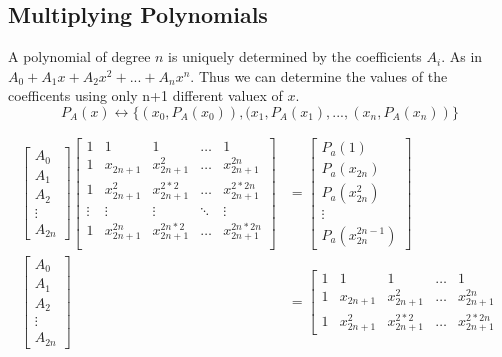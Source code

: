 \documentclass[a4paper]{article}
\begin{document}
\subsection{Multiplying Polynomials}
A polynomial of degree $n$ is uniquely determined by the coefficients $A_i$. As in $ A_0 + A_1 x + A_2 x^2 + ... + A_n x^n$. Thus we can determine the values of the coefficents using only n+1 different valuex of $x$.
$$P_A (x) \leftrightarrow \{(x_0, P_A (x_0)), (x_1, P_A (x_1), ..., (x_n, P_A (x_n))\}$$

 \begin{align*}
		 \left[ \begin{array}{c} A_0 \\ A_1 \\ A_2 \\ \vdots \\ A_{2n} \end{array} \right]
		\left[ \begin{array}{ccccc} 1 & 1 & 1 & \dots & 1 \\ 1 & x_{2n+1} & x_{2n+1}^2 & \dots & x_{2n+1}^{2n} 	\\ 1 & x_{2n+1}^2 & x_{2n+1}^{2*2} & \dots & x_{2n+1}^{2*2n} 
            \\ \vdots & \vdots & \vdots & \ddots & \vdots \\
            1 & x_{2n+1}^{2n} & x_{2n+1}^{2n * 2} & \dots & x_{2n+1}^{2n * 2n} \\
                \end{array}\right]
				&=  \left[ \begin{array}{c} P_a (1) \\ P_a (x_{2n}) \\ P_a (x_{2n}^{2})\\ \vdots \\ P_a (x_{2n}^{2n-1}) \end{array} \right] \\
            \left[ \begin{array}{c} A_0 \\ A_1 \\ A_2 \\ \vdots \\ A_{2n} \end{array} \right] &=
            \left[ \begin{array}{ccccc} 1 & 1 & 1 & \dots & 1 \\ 1 & x_{2n+1} & x_{2n+1}^2 & \dots & x_{2n+1}^{2n} 
            \\ 1 & x_{2n+1}^2 & x_{2n+1}^{2*2} & \dots & x_{2n+1}^{2*2n} 

\end{array}
\end{align*}
\end{document}
